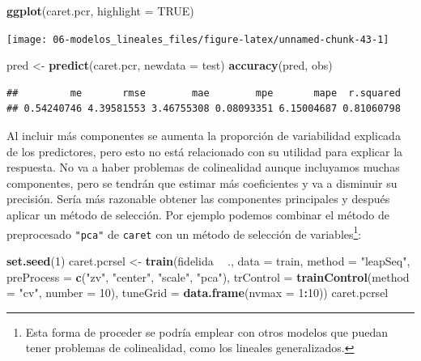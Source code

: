 \documentclass[
  spanish,
]{book}
\newenvironment{Shaded}{\begin{snugshade}}{\end{snugshade}}
\newcommand{\DataTypeTok}[1]{\textcolor[rgb]{0.13,0.29,0.53}{#1}}
\newcommand{\DecValTok}[1]{\textcolor[rgb]{0.00,0.00,0.81}{#1}}
\newcommand{\KeywordTok}[1]{\textcolor[rgb]{0.13,0.29,0.53}{\textbf{#1}}}
\newcommand{\NormalTok}[1]{#1}
\newcommand{\OperatorTok}[1]{\textcolor[rgb]{0.81,0.36,0.00}{\textbf{#1}}}
\newcommand{\OtherTok}[1]{\textcolor[rgb]{0.56,0.35,0.01}{#1}}
\newcommand{\StringTok}[1]{\textcolor[rgb]{0.31,0.60,0.02}{#1}}
\theoremstyle{break}
\theoremstyle{definition}
\theoremstyle{definition}
\theoremstyle{definition}
\theoremstyle{remark}
\begin{document}
\begin{Shaded}
\begin{Highlighting}[]
\KeywordTok{ggplot}\NormalTok{(caret.pcr, }\DataTypeTok{highlight =} \OtherTok{TRUE}\NormalTok{)}
\end{Highlighting}
\end{Shaded}

\begin{center}\texttt{[image: 06-modelos\_lineales\_files/figure-latex/unnamed-chunk-43-1]} \end{center}

\begin{Shaded}
\begin{Highlighting}[]
\NormalTok{pred <-}\StringTok{ }\KeywordTok{predict}\NormalTok{(caret.pcr, }\DataTypeTok{newdata =}\NormalTok{ test)}
\KeywordTok{accuracy}\NormalTok{(pred, obs)}
\end{Highlighting}
\end{Shaded}

\begin{verbatim}
##         me       rmse        mae        mpe       mape  r.squared 
## 0.54240746 4.39581553 3.46755308 0.08093351 6.15004687 0.81060798
\end{verbatim}

Al incluir más componentes se aumenta la proporción de variabilidad explicada de los predictores,
pero esto no está relacionado con su utilidad para explicar la respuesta.
No va a haber problemas de colinealidad aunque incluyamos muchas componentes, pero se tendrán que estimar más coeficientes y va a disminuir su precisión.
Sería más razonable obtener las componentes principales y después aplicar un método de selección.
Por ejemplo podemos combinar el método de preprocesado \texttt{"pca"} de \texttt{caret} con un método de selección de variables\footnote{Esta forma de proceder se podría emplear con otros modelos que puedan tener problemas de colinealidad, como los lineales generalizados.}:

\begin{Shaded}
\begin{Highlighting}[]
\KeywordTok{set.seed}\NormalTok{(}\DecValTok{1}\NormalTok{)}
\NormalTok{caret.pcrsel <-}\StringTok{ }\KeywordTok{train}\NormalTok{(fidelida }\OperatorTok{~}\StringTok{ }\NormalTok{., }\DataTypeTok{data =}\NormalTok{ train, }\DataTypeTok{method =} \StringTok{"leapSeq"}\NormalTok{,}
                   \DataTypeTok{preProcess =} \KeywordTok{c}\NormalTok{(}\StringTok{"zv"}\NormalTok{, }\StringTok{"center"}\NormalTok{, }\StringTok{"scale"}\NormalTok{, }\StringTok{"pca"}\NormalTok{),     }
                   \DataTypeTok{trControl =} \KeywordTok{trainControl}\NormalTok{(}\DataTypeTok{method =} \StringTok{"cv"}\NormalTok{, }\DataTypeTok{number =} \DecValTok{10}\NormalTok{),}
                   \DataTypeTok{tuneGrid =} \KeywordTok{data.frame}\NormalTok{(}\DataTypeTok{nvmax =} \DecValTok{1}\OperatorTok{:}\DecValTok{10}\NormalTok{))}
\NormalTok{caret.pcrsel}
\end{Highlighting}
\end{Shaded}
\end{document}
